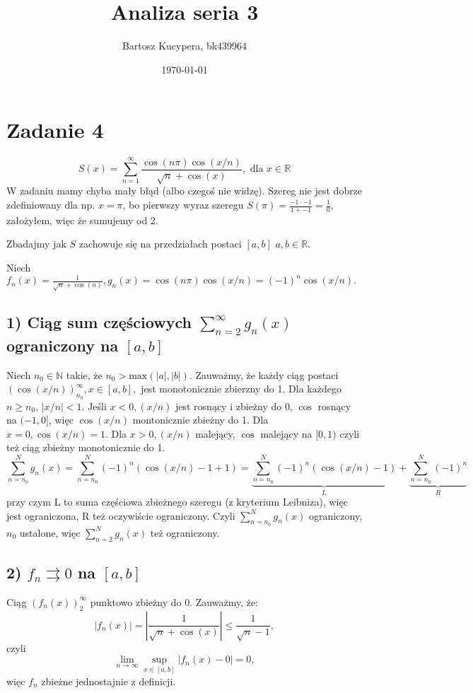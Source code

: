 \documentclass{article}
\title{Analiza seria 3}
\author{Bartosz Kucypera, bk439964}
\date{\today}
\begin{document}
\maketitle

\section*{Zadanie 4}
$$ S(x) = \sum^{\infty}_{n=1} \frac{\cos(n\pi)\cos(x/n)}{\sqrt{n} + \cos(x)}, \mbox{ dla } x \in \mathbb{R} $$
W zadaniu mamy chyba mały błąd (albo czegoś nie widzę). Szereg nie jest dobrze zdefiniowany dla np. $x = \pi$, bo pierwszy wyraz szeregu $S(\pi) = \displaystyle \frac{-1 \cdot -1}{1 + -1} = \frac{1}{0}$, założyłem, więc że sumujemy od 2.

Zbadajmy jak $S$ zachowuje się na przedziałach postaci $[a, b]$ $a,b \in \mathbb{R}.$ \newline

Niech $f_n(x) = \frac{1}{\sqrt{n} + \cos(n)}, g_n(x) = \cos(n\pi)\cos(x/n) = (-1)^n\cos(x /n).$
\subsection*{1) Ciąg sum częściowych $\displaystyle \sum_{n=2}^{\infty}g_n(x)$ ograniczony na $[a, b]$}
Niech $n_0 \in \mathbb{N}$ takie, że $n_0 > \mbox{max}(|a|,|b|)$. 
\newline Zauważmy, że każdy ciąg postaci $(\cos(x /n))_{n_0}^{\infty}, x \in [a, b],$ jest monotonicznie zbierzny do 1. \newline
Dla każdego $n \ge n_0$, $|x/n| < 1$. Jeśli $x < 0, (x/n)$ jest rosnący i zbieżny do 0, $\cos$ rosnący na $(-1, 0]$, więc $\cos(x/n)$ montonicznie zbieżny do 1. \newline
Dla $x = 0, \cos(x /n) = 1$. \newline 
Dla $x > 0, (x/n)$ malejący, $\cos$ malejący na $[0, 1)$ czyli też ciąg zbieżny monotonicznie do 1.
$$ \sum_{n=n_0}^{N}g_n(x) = \sum_{n=n_0}^{N}(-1)^n(\cos(x /n) - 1 + 1) = 
\underbrace{\sum_{n = n_0}^{N}(-1)^n(\cos(x /n) - 1)}_L + \underbrace{\sum_{n = n_0}^N(-1)^n}_R$$
przy czym L to suma częściowa zbieżnego szeregu (z kryterium Leibniza), więc jest ograniczona, R też oczywiście ograniczony. \newline \newline
Czyli $\displaystyle \sum_{n=n_0}^{N}g_n(x)$ ograniczony, $n_0$ ustalone, więc $\displaystyle \sum_{n=2}^{N}g_n(x)$ też ograniczony.
\subsection*{2) $f_n \rightrightarrows 0$ na $[a, b]$}
Ciąg $\displaystyle (f_n(x))_2^{\infty}$ punktowo zbieżny do 0. \newline
Zauważmy, że: 
$$ |f_n(x)| = \left|\frac{1}{\sqrt{n} + \cos(x)}\right| \le \frac{1}{\sqrt{n}-1}, $$
czyli
$$ \lim_{n \to \infty } \sup_{x\in [a, b]}|f_n(x) - 0| = 0,$$
więc $f_n$ zbieżne jednostajnie z definicji.
\end{document}
